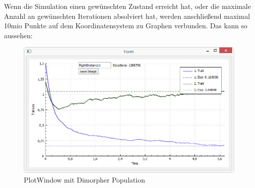 \documentclass[11pt, a4paper, german]{article}
\begin{document}
	Wenn die Simulation  einen gewünschten Zustand erreicht hat, oder die maximale Anzahl an gewünschten Iterationen absolviert hat, werden anschließend maximal 10mio Punkte auf dem Koordinatensystem zu Graphen verbunden. Das kann so aussehen:
	\begin{figure}[H]
		\centering
		\includegraphics[width=0.7\linewidth]{./Pictures/PlotWindow_smallBPDL}
		\caption[PlotWindow]{PlotWindow mit Dimorpher Population}
		\label{PlotWindow}
	\end{figure}

\clearpage
\end{document}
